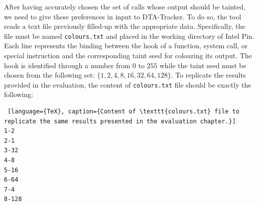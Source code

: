 \documentclass[LaM,binding=0.6cm]{sapthesis}
\begin{document}
\noindent
After having accurately chosen the set of calls whose output should be tainted, we need to give these preferences in input to {\sf DTA-Tracker}. To do so, the tool reads a text file previously filled-up with the appropriate data. Specifically, the file must be named \texttt{colours.txt} and placed in the working directory of Intel Pin. Each line represents the binding between the hook of a function, system call, or special instruction and the corresponding taint seed for colouring its output. The hook is identified through a number from $0$ to $255$ while the taint seed must be chosen from the following set: $\{1, 2, 4, 8, 16, 32, 64, 128\}$. To replicate the results provided in the evaluation, the content of \texttt{colours.txt} file should be exactly the following:
\begin{lstlisting} [language={TeX}, caption={Content of \texttt{colours.txt} file to replicate the same results presented in the evaluation chapter.}]
1-2
2-1
3-32
4-8
5-16
6-64
7-4
8-128
\end{lstlisting}
\end{document}
